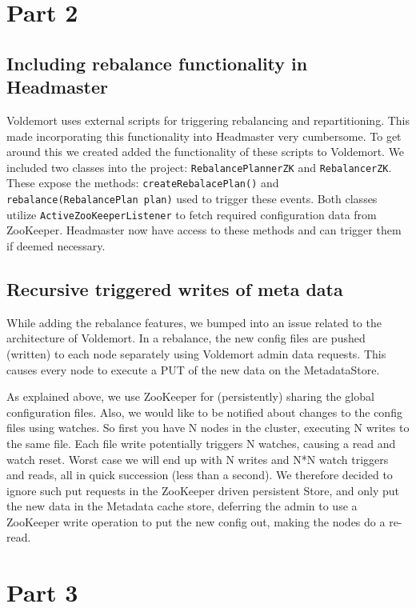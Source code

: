 \section{Part 2}

\subsection{Including rebalance functionality in Headmaster}
Voldemort uses external scripts for triggering rebalancing and repartitioning. This made incorporating this functionality into Headmaster very cumbersome. To get around this we created added the functionality of these scripts to Voldemort. We included two classes into the project: \texttt{RebalancePlannerZK} and \texttt{RebalancerZK}. These expose the methods: \texttt{createRebalacePlan()} and \texttt{rebalance(RebalancePlan plan)} used to trigger these events. Both classes utilize \texttt{ActiveZooKeeperListener} to fetch required configuration data from ZooKeeper. Headmaster now have access to these methods and can trigger them if deemed necessary. 

\subsection{Recursive triggered writes of meta data}
While adding the rebalance features, we bumped into an issue related to the architecture of Voldemort.
In a rebalance, the new config files are pushed (written) to each node separately using Voldemort admin data requests. This causes every node to execute a PUT of the new data on the MetadataStore.

As explained above, we use ZooKeeper for (persistently) sharing the global configuration files.
Also, we would like to be notified about changes to the config files using watches. So first you have N nodes in the cluster, executing N writes to the same file. Each file write potentially triggers N watches, causing a read and watch reset. Worst case we will end up with N writes and N*N watch triggers and reads, all in quick succession (less than a second).
We therefore decided to ignore such put requests in the ZooKeeper driven persistent Store, and only put the new data in the Metadata cache store, deferring the admin to use a ZooKeeper write operation to put the new config out, making the nodes do a re-read.



\section{Part 3}

